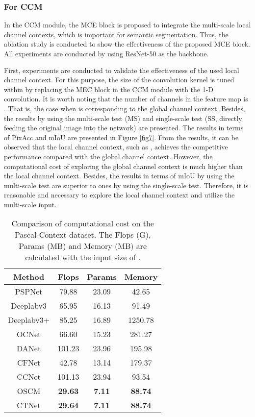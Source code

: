 \documentclass[10pt,journal,cspaper,compsoc]{IEEEtran}
\begin{document}
\subsubsection{For CCM}
In the CCM module, the MCE block is proposed to integrate the multi-scale local channel contexts, which is important for semantic segmentation. Thus, the ablation study is conducted to show the effectiveness of the proposed MCE block. All experiments are conducted by using ResNet-50 as the backbone.

First, experiments are conducted to validate the effectiveness of the used local channel context. For this purpose, the size of the convolution kernel  is tuned within  by replacing the MEC block in the CCM module with the 1-D convolution. It is worth noting that the number of channels in the feature map is . That is, the case when  is corresponding to the global channel context. Besides, the results by using the multi-scale test (MS) and single-scale test (SS, directly feeding the original image into the network) are presented. The results in terms of PixAcc and mIoU are presented in Figure \ref{fig7}. From the results, it can be observed that the local channel context, such as , achieves the competitive performance compared with the global channel context. However, the computational cost of exploring the global channel context is much higher than the local channel context. Besides, the results in terms of mIoU by using the multi-scale test are superior to ones by using the single-scale test. Therefore, it is reasonable and necessary to explore the local channel context and utilize the multi-scale input.
	
\begin{table}[t]
\caption{Comparison of computational cost on the Pascal-Context dataset. The Flops (G), Params (MB) and Memory (MB) are calculated with the input size of . }
\label{table3}
		\renewcommand\arraystretch{1.3}
		\centering
		\begin{tabular}{c|c|c|c}
			\hline
			Method &Flops&Params &Memory\\
			\hline
			PSPNet \cite{zhao2017pyramid}  & 79.88&23.09 &42.65\\
			Deeplabv3 \cite{chen2017rethinking}& 65.95& 16.13&91.49\\
			Deeplabv3+ \cite{chen2018encoder} & 85.25& 16.89&1250.78\\
			\hline
			OCNet \cite{yu2020context} &66.60&15.23&281.27 \\
			DANet \cite{fu2019dual}&  101.23 &23.96& 195.98\\
			CFNet \cite{zhang2019co} & 42.78 & 13.14& 179.37\\
			CCNet \cite{huang2019ccnet}& 101.13 & 23.94 & 93.54\\
			\hline
			OSCM &\textbf{29.63}&\textbf{7.11}&\textbf{88.74}\\
			CTNet &\textbf{29.64} & \textbf{7.11}& \textbf{88.74}\\
			\hline
	\end{tabular}
\end{table}
	
\end{document}
